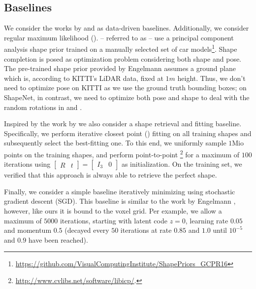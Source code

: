 \subsection{Baselines}
\label{sec:baselines}

%
{We consider the works by \cite{Engelmann2016GCPR} and \cite{Gupta2015CVPR} as data-driven baselines. Additionally, we consider regular maximum likelihood (\ML). \cite{Engelmann2016GCPR} -- referred to as \Engelmann\xspace-- use a principal component analysis shape prior trained on a manually selected set of car models\footnote{\url{https://github.com/VisualComputingInstitute/ShapePriors_GCPR16}}. Shape completion is posed as optimization problem considering both shape and pose. The pre-trained shape prior provided by Engelmann \etal assumes a ground plane which is, according to KITTI's LiDAR data, fixed at $1m$ height. Thus, we don't need to optimize pose on KITTI as we use the ground truth bounding boxes; on ShapeNet, in contrast, we need to optimize both pose and shape to deal with the random rotations in \clean and \noisy.}




Inspired by the work by \cite{Gupta2015CVPR} we also consider a shape retrieval and fitting baseline. Specifically, we perform iterative closest point (\ICP) \citep{Besl1992PAMI} fitting on all training shapes and subsequently select the best-fitting one. To this end, we uniformly sample $1\text{Mio}$ points on the training shapes, and perform point-to-point \ICP\footnote{\url{http://www.cvlibs.net/software/libicp/}.} for a maximum of $100$ iterations using $\left[\begin{matrix}R & t\end{matrix}\right] = \left[\begin{matrix}I_3 & 0\end{matrix}\right]$ as initialization. On the training set, we verified that this approach is always able to retrieve the perfect shape.

Finally, we consider a simple \ML baseline iteratively minimizing  using stochastic gradient descent (SGD). This baseline is similar to the work by Engelmann \etal, however, like ours it is bound to the voxel grid. Per example, we allow a maximum of $5000$ iterations, starting with latent code $z = 0$, learning rate $0.05$ and momentum $0.5$ (decayed every $50$ iterations at rate $0.85$ and $1.0$ until $10^{-5}$ and $0.9$ have been reached).

